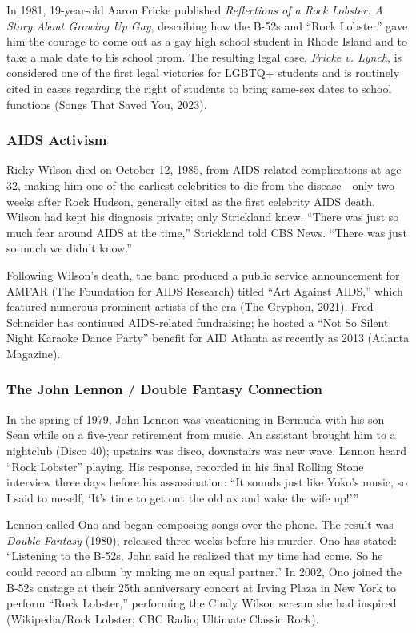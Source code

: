 \documentclass[11pt,letterpaper]{article}
\begin{document}
In 1981, 19-year-old Aaron Fricke published \textit{Reflections of a Rock Lobster: A Story About Growing Up Gay}, describing how the B-52s and ``Rock Lobster'' gave him the courage to come out as a gay high school student in Rhode Island and to take a male date to his school prom. The resulting legal case, \textit{Fricke v. Lynch}, is considered one of the first legal victories for LGBTQ+ students and is routinely cited in cases regarding the right of students to bring same-sex dates to school functions (Songs That Saved You, 2023).

\subsubsection{AIDS Activism}

Ricky Wilson died on October 12, 1985, from AIDS-related complications at age 32, making him one of the earliest celebrities to die from the disease---only two weeks after Rock Hudson, generally cited as the first celebrity AIDS death. Wilson had kept his diagnosis private; only Strickland knew. ``There was just so much fear around AIDS at the time,'' Strickland told CBS News. ``There was just so much we didn't know.''

Following Wilson's death, the band produced a public service announcement for AMFAR (The Foundation for AIDS Research) titled ``Art Against AIDS,'' which featured numerous prominent artists of the era (The Gryphon, 2021). Fred Schneider has continued AIDS-related fundraising; he hosted a ``Not So Silent Night Karaoke Dance Party'' benefit for AID Atlanta as recently as 2013 (Atlanta Magazine).

\subsubsection{The John Lennon / Double Fantasy Connection}

In the spring of 1979, John Lennon was vacationing in Bermuda with his son Sean while on a five-year retirement from music. An assistant brought him to a nightclub (Disco 40); upstairs was disco, downstairs was new wave. Lennon heard ``Rock Lobster'' playing. His response, recorded in his final Rolling Stone interview three days before his assassination: ``It sounds just like Yoko's music, so I said to meself, `It's time to get out the old ax and wake the wife up!'''

Lennon called Ono and began composing songs over the phone. The result was \textit{Double Fantasy} (1980), released three weeks before his murder. Ono has stated: ``Listening to the B-52s, John said he realized that my time had come. So he could record an album by making me an equal partner.'' In 2002, Ono joined the B-52s onstage at their 25th anniversary concert at Irving Plaza in New York to perform ``Rock Lobster,'' performing the Cindy Wilson scream she had inspired (Wikipedia/Rock Lobster; CBC Radio; Ultimate Classic Rock).
\end{document}
